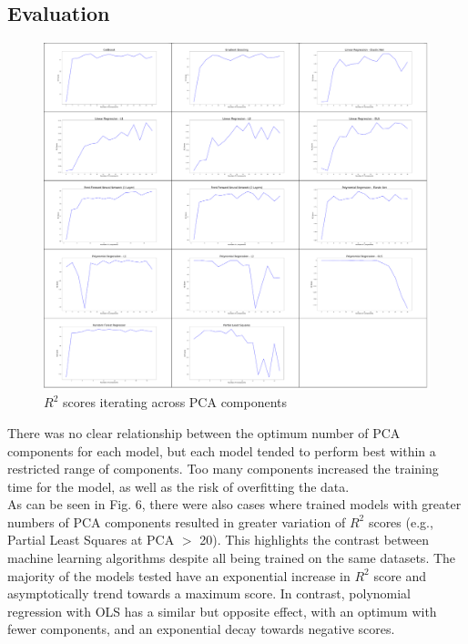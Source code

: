 \documentclass[11pt, titlepage]{article}
\begin{document}
\subsection{Evaluation}
\begin{figure}[ht]
\centering
\includegraphics[width=16cm]{media/PCAiteration.png}
\caption{$R^{2}$ scores iterating across PCA components}
\end{figure} 

There was no clear relationship between the optimum number of PCA components for each model, but each model tended to perform best within a restricted range of components. Too many components increased the training time for the model, as well as the risk of overfitting the data.\\

As can be seen in Fig. 6, there were also cases where trained models with greater numbers of PCA components resulted in greater variation of $R^2$ scores (e.g., Partial Least Squares at PCA $>$ 20). This highlights the contrast between machine learning algorithms despite all being trained on the same datasets. The majority of the models tested have an exponential increase in $R^{2}$ score and asymptotically trend towards a maximum score. In contrast, polynomial regression with OLS has a similar but opposite effect, with an optimum with fewer components, and an exponential decay towards negative scores.\\
\end{document}
